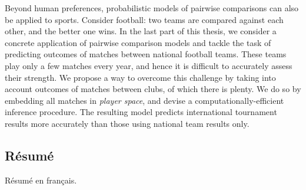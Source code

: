Beyond human preferences, probabilistic models of pairwise comparisons can also be applied to sports.
Consider football: two teams are compared against each other, and the better one wins.
In the last part of this thesis, we consider a concrete application of pairwise comparison models and tackle the task of predicting outcomes of matches between national football teams.
These teams play only a few matches every year, and hence it is difficult to accurately assess their strength.
We propose a way to overcome this challenge by taking into account outcomes of matches between clubs, of which there is plenty.
We do so by embedding all matches in \emph{player space}, and devise a computationally-efficient inference procedure.
The resulting model predicts international tournament results more accurately than those using national team results only.


\cleardoublepage

\begin{otherlanguage}{french}
\chapter*{Résumé}

Résumé en français.
\end{otherlanguage}
